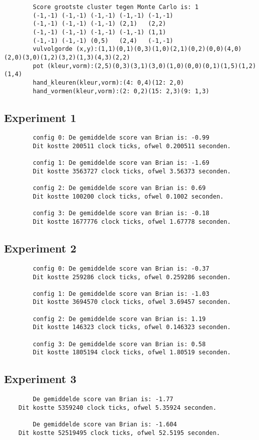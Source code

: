\documentclass[10pt]{article}
\begin{document}
\begin{appendices}
\begin{lstlisting}
        Score grootste cluster tegen Monte Carlo is: 1
        (-1,-1) (-1,-1) (-1,-1) (-1,-1) (-1,-1)
        (-1,-1) (-1,-1) (-1,-1) (2,1)   (2,2)
        (-1,-1) (-1,-1) (-1,-1) (-1,-1) (1,1)
        (-1,-1) (-1,-1) (0,5)   (2,4)   (-1,-1)
        vulvolgorde (x,y):(1,1)(0,1)(0,3)(1,0)(2,1)(0,2)(0,0)(4,0)(2,0)(3,0)(1,2)(3,2)(1,3)(4,3)(2,2)
        pot (kleur,vorm):(2,5)(0,3)(3,1)(3,0)(1,0)(0,0)(0,1)(1,5)(1,2)(1,4)
        hand_kleuren(kleur,vorm):(4: 0,4)(12: 2,0)
        hand_vormen(kleur,vorm):(2: 0,2)(15: 2,3)(9: 1,3)
    \end{lstlisting}
    \subsection{Experiment 1}
    \begin{lstlisting}
        config 0: De gemiddelde score van Brian is: -0.99
        Dit kostte 200511 clock ticks, ofwel 0.200511 seconden.
        
        config 1: De gemiddelde score van Brian is: -1.69
        Dit kostte 3563727 clock ticks, ofwel 3.56373 seconden.
        
        config 2: De gemiddelde score van Brian is: 0.69
        Dit kostte 100200 clock ticks, ofwel 0.1002 seconden.
        
        config 3: De gemiddelde score van Brian is: -0.18
        Dit kostte 1677776 clock ticks, ofwel 1.67778 seconden.
    \end{lstlisting}
    \subsection{Experiment 2}
    \begin{lstlisting}
        config 0: De gemiddelde score van Brian is: -0.37
        Dit kostte 259286 clock ticks, ofwel 0.259286 seconden.
        
        config 1: De gemiddelde score van Brian is: -1.03
        Dit kostte 3694570 clock ticks, ofwel 3.69457 seconden.
        
        config 2: De gemiddelde score van Brian is: 1.19
        Dit kostte 146323 clock ticks, ofwel 0.146323 seconden.
        
        config 3: De gemiddelde score van Brian is: 0.58
        Dit kostte 1805194 clock ticks, ofwel 1.80519 seconden.
    \end{lstlisting}
    \subsection{Experiment 3}
    \begin{lstlisting}
        De gemiddelde score van Brian is: -1.77
    Dit kostte 5359240 clock ticks, ofwel 5.35924 seconden.

        De gemiddelde score van Brian is: -1.604
    Dit kostte 52519495 clock ticks, ofwel 52.5195 seconden.
    \end{lstlisting}
\end{appendices}
\end{document}
